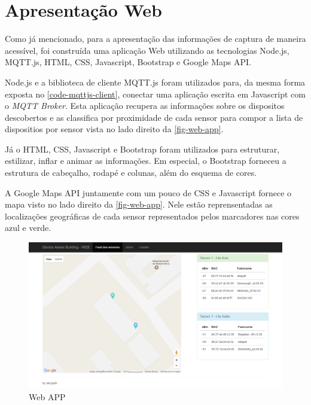 \section{Apresentação Web}
\label{sec:app-web}

Como já mencionado, para a apresentação das informações de captura de maneira
acessível, foi construída uma aplicação Web utilizando as tecnologias
Node.js, MQTT.js, HTML, CSS, Javascript,
Bootstrap e Google Maps API.

Node.js e a biblioteca de cliente MQTT.js foram utilizados para,
da mesma forma exposta no \autoref{code-mqttjs-client}, conectar
uma aplicação escrita em Javascript com o \emph{MQTT Broker}. Esta
aplicação recupera as informações sobre os dispositos descobertos e as
classifica por proximidade de cada sensor para compor a lista de dispositios
por sensor vista no lado direito da \autoref{fig-web-app}.

Já o HTML, CSS, Javascript e Bootstrap foram
utilizados para estruturar, estilizar, inflar e animar as informações. Em
especial, o Bootstrap forneceu a estrutura de cabeçalho, rodapé e colunas,
além do esquema de cores.

A Google Maps API juntamente com um pouco de CSS e
Javascript fornece o mapa visto no lado direito da \autoref{fig-web-app}.
Nele estão reprensentadas as localizações geográficas de cada sensor
representados pelos marcadores nas cores azul e verde.

\begin{figure}[htb]
	\caption{\label{fig-web-app}Web APP}
	\begin{center}
		\includegraphics[width=1\textwidth]{053-web/web-app.png}
	\end{center}
\end{figure}
